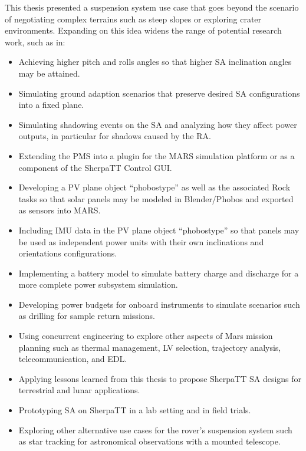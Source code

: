 This thesis presented a suspension system use case that goes beyond the scenario of negotiating complex terrains such as steep slopes or exploring crater environments. Expanding on this idea widens the range of potential research work, such as in:
\begin{itemize}
  \item Achieving higher pitch and rolls angles so that higher \ac{SA} inclination angles may be attained.
  \item Simulating ground adaption scenarios that preserve desired \ac{SA} configurations into a fixed plane.
  \item Simulating shadowing events on the \ac{SA} and analyzing how they affect power outputs, in particular for shadows caused by the \ac{RA}.
  \item Extending the \ac{PMS} into a plugin for the MARS simulation platform or as a component of the SherpaTT Control GUI.
  \item Developing a \ac{PV} plane object ``phobostype'' as well as the associated Rock tasks so that solar panels may be modeled in Blender/Phobos and exported as sensors into MARS.   \item Including \ac{IMU} data in the \ac{PV} plane object ``phobostype'' so that panels may be used as independent power units with their own inclinations and orientations configurations.
  \item Implementing a battery model to simulate battery charge and discharge for a more complete power subsystem simulation.
  \item Developing power budgets for onboard instruments to simulate scenarios such as drilling for sample return missions.
  \item Using concurrent engineering to explore other aspects of Mars mission planning such as thermal management, \ac{LV} selection, trajectory analysis, telecommunication, and \ac{EDL}.
  \item Applying lessons learned from this thesis to propose SherpaTT \ac{SA} designs for terrestrial and lunar applications.
  \item Prototyping \ac{SA} on SherpaTT in a lab setting and in field trials.
  \item Exploring other alternative use cases for the rover's suspension system such as star tracking for astronomical observations with a mounted telescope.
\end{itemize}
